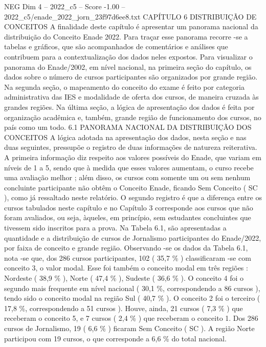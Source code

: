 \begin{textsample}{NEG Dim 4 – 2022\_c5 – Score -1.00 – 2022\_c5/enade\_2022\_jorn\_23f97d6ee8.txt}  \label{ex:f4_neg_076}
CAPÍTULO 6 DISTRIBUIÇÃO DE CONCEITOS A finalidade deste capítulo é apresentar um panorama nacional da distribuição do Conceito Enade 2022.
Para traçar esse panorama recorre -se a tabelas e gráficos, que são acompanhados de comentários e análises que contribuem para a contextualização dos dados neles expostos.
Para visualizar o panorama do Enade/2002, em nível nacional, na primeira seção do capítulo, os dados sobre o número de cursos participantes são organizados por grande região.
Na segunda seção, o mapeamento do conceito do exame é feito por categoria administrativa das IES e modalidade de oferta dos cursos, de maneira cruzada às grandes regiões.
Na última seção, a lógica de apresentação dos dados é feita por organização acadêmica e, também, grande região de funcionamento dos cursos, no país como um todo. 6.1 PANORAMA NACIONAL DA DISTRIBUIÇÃO DOS CONCEITOS A lógica adotada na apresentação dos dados, nesta seção e nas duas seguintes, pressupõe o registro de duas informações de natureza reiterativa.
A primeira informação diz respeito aos valores possíveis do Enade, que variam em níveis de 1 a 5, sendo que à medida que esses valores aumentam, o curso recebe uma avaliação melhor ; além disso, os cursos com somente um ou sem nenhum concluinte participante não obtêm o Conceito Enade, ficando Sem Conceito ( SC ), como já ressaltado neste relatório.
O segundo registro é que a diferença entre os cursos tabulados neste capítulo e no Capítulo 3 corresponde aos cursos que não foram avaliados, ou seja, àqueles, em princípio, sem estudantes concluintes que tivessem sido inscritos para a prova.
Na Tabela 6.1, são apresentadas a quantidade e a distribuição de cursos de Jornalismo participantes do Enade/2022, por faixa de conceito e grande região.
Observando -se os dados da Tabela 6.1, nota -se que, dos 286 cursos participantes, 102 ( 35,7 \% ) classificaram -se com conceito 3, o valor modal.
Esse foi também o conceito modal em três regiões : Nordeste ( 38,9 \% ), Norte ( 47,4 \% ), Sudeste ( 36,6 \% ).
O conceito 4 foi o segundo mais frequente em nível nacional ( 30,1 \%, correspondendo a 86 cursos ), tendo sido o conceito modal na região Sul ( 40,7 \% ).
O conceito 2 foi o terceiro ( 17,8 \%, correspondendo a 51 cursos ).
Houve, ainda, 21 cursos ( 7,3 \% ) que receberam o conceito 5, e 7 cursos ( 2,4 \% ) que receberam o conceito 1.
Dos 286 cursos de Jornalismo, 19 ( 6,6 \% ) ficaram Sem Conceito ( SC ).
A região Norte participou com 19 cursos, o que corresponde a 6,6 \% do total nacional.

\end{textsample}
